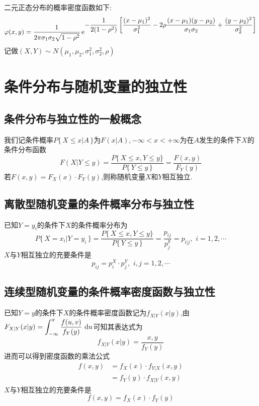 \example[二元正态分布]
二元正态分布的概率密度函数如下:
\begin{equation}
\varphi(x,y)=\frac{1}{2\pi \sigma_1\sigma_2\sqrt{1-\rho^2}}\,{\rm{e}}^{\displaystyle -\frac{1}{2(1-\rho^2)}\left[ \frac{(x-\mu_1)^2}{\sigma_1^2} -2\rho\frac{(x-\mu_1)(y-\mu_2)}{\sigma_1\sigma_2}+\frac{(y-\mu_2)^2}{\sigma_2^2} \right] }
\end{equation}
记做$(X,Y)\sim N(\mu_1,\mu_2,\sigma_1^2,\sigma_2^2,\rho)$

\section{条件分布与随机变量的独立性}
\subsection{条件分布与独立性的一般概念}
\tdefination[条件分布与独立性的一般概念]
我们记条件概率$P \lbrace \, X \le x|A\,\rbrace$为$F( x |A ),-\infty <x<+\infty $为在$A$发生的条件下$X$的条件分布函数
\begin{equation}
F(X|Y\le y)=\frac{P\lbrace\,X \le x,Y \le y \rbrace}{P\lbrace\, Y \le y \, \rbrace}=\frac{F(x,y)}{F_Y(y)}
\end{equation}
若$F(x,y)=F_X(x)\cdot F_Y(y)$,则称随机变量$X$和$Y$相互独立.\jg

\subsection{离散型随机变量的条件概率分布与独立性}
\tdefination[离散型随机变量的条件概率分布与独立性]
已知$Y=y_i$的条件下$X$的条件概率分布为
\begin{equation}
P\lbrace\,X=x_i|Y=y_i\,\rbrace =\frac{P\lbrace\,X \le x,Y \le y \rbrace}{P\lbrace\, Y \le y \, \rbrace}=\frac{p_{ij}}{p_j^y}=p_{i|j},\,\,i=1,2,\cdots
\end{equation}
$X$与$Y$相互独立的充要条件是
\begin{equation}
p_{ij}=p_i^X\cdot p_j^Y,\,\,i,j=1,2,\cdots
\end{equation}
\jg

\subsection{连续型随机变量的条件概率密度函数与独立性}
\tdefination[连续型随机变量的条件概率密度函数与独立性]
已知$Y=y$的条件下$X$的条件概率密度函数记为$f_{X|Y}(x|y)$,由$\displaystyle F_{X|Y}(x|y)=\int_{-\infty}^{x}\frac{f(u,v)}{f_Y(y)}\,\,{\rm{d}} u$可知其表达式为
\begin{equation}
f_{X|Y}(x|y)=\frac{x,y}{f_Y(y)}
\end{equation}
进而可以得到密度函数的乘法公式
\begin{equation}
\begin{split}
f(x,y)&=f_X(x)\cdot f_{Y|X}(x,y)\\
&=f_Y(y)\cdot f_{X|Y}(x,y)
\end{split}
\end{equation}
$X$与$Y$相互独立的充要条件是
\begin{equation}
f(x,y)=f_X(x)\cdot f_Y(y)
\end{equation}

